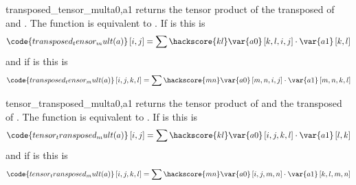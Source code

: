 \begin{funcdesc}{transposed_tensor_mult}{a0,a1}
returns the tensor product of the transposed of  and . The function is equivalent to
.
If  is \RankTwo this is
\begin{equation}
\code{transposed_tensor_mult(a)}\left[i,j\right]=\sum\hackscore{kl}\var{a0}\left[k,l,i,j\right] \cdot \var{a1} \left[k,l\right]
\end{equation} 
and if  is \RankFour this is
\begin{equation}
\code{transposed_tensor_mult(a)}\left[i,j,k,l\right]=\sum\hackscore{mn}\var{a0} \left[m,n,i,j\right] \cdot \var{a1} \left[m,n,k,l\right]
\end{equation} 
\end{funcdesc}

\begin{funcdesc}{tensor_transposed_mult}{a0,a1}
returns the tensor product of  and the transposed of . 
The function is equivalent to
.
If  is \RankTwo this is
\begin{equation}
\code{tensor_transposed_mult(a)}\left[i,j\right]=\sum\hackscore{kl}\var{a0}\left[i,j,k,l\right] \cdot \var{a1} \left[l,k\right]
\end{equation} 
and if  is \RankFour this is
\begin{equation}
\code{tensor_transposed_mult(a)}\left[i,j,k,l\right]=\sum\hackscore{mn}\var{a0} \left[i,j,m,n\right] \cdot \var{a1} \left[k,l,m,n\right]
\end{equation} 
\end{funcdesc}


